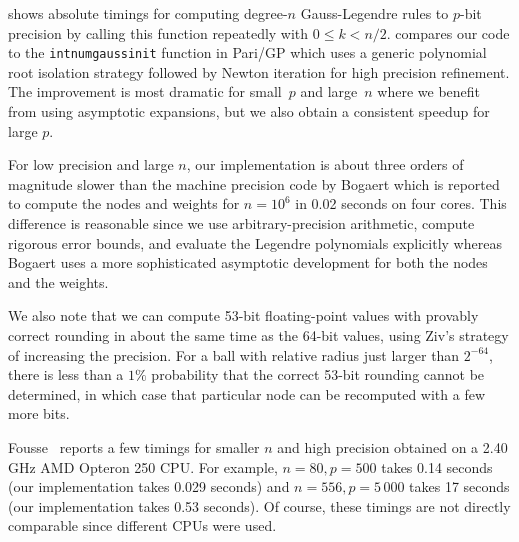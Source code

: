 \documentclass[nohypdvips,review]{siamart0216}
\begin{document}
 shows absolute timings for computing
degree-$n$ Gauss-Legendre rules to $p$-bit precision
by calling this function repeatedly with $0 \le k < n / 2$.
 compares our code
to the \texttt{intnumgaussinit} function in Pari/GP
which uses a generic polynomial root isolation strategy
followed by Newton iteration for high precision refinement.
The improvement is most dramatic for small~$p$ and large~$n$ where
we benefit from using asymptotic expansions, but we also obtain a
consistent speedup for large $p$.

For low precision and large $n$, our implementation
is about three orders of magnitude slower than the machine precision
code by Bogaert \cite{bogaert2014iteration}
which is reported to compute the nodes and weights for $n = 10^6$
in 0.02 seconds on four cores.
This difference is reasonable since we use arbitrary-precision arithmetic,
compute rigorous error bounds, and evaluate the Legendre polynomials
explicitly whereas Bogaert uses a more sophisticated
asymptotic development for both the nodes and the weights.

We also note that we can compute 53-bit floating-point values
with provably correct rounding in about the same time as the 64-bit
values, using Ziv's strategy of increasing the precision.
For a ball with relative radius just larger than $2^{-64}$, there
is less than a $1\%$ probability that the correct 53-bit rounding
cannot be determined, in which case that particular node
can be recomputed with a few more bits.

Fousse~\cite{fousse2007accurate} reports a few timings for smaller $n$ and high precision
obtained on a 2.40 GHz AMD Opteron 250 CPU.
For example, $n = 80, p = 500$ takes 0.14 seconds (our implementation
takes 0.029 seconds) and $n = 556, p = 5\,000$ takes 17 seconds
(our implementation takes 0.53 seconds).
Of course, these timings are not directly comparable since different
CPUs were used.
\end{document}
